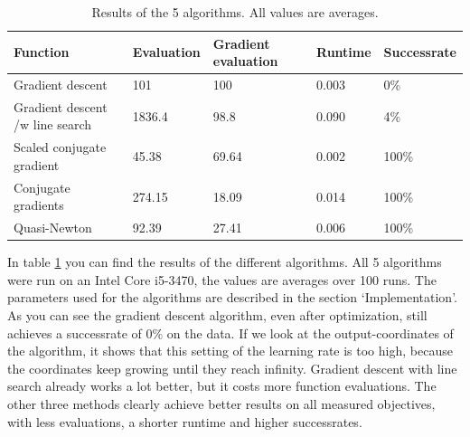 \documentclass{article}
\begin{document}
\begin{table}[H]
	\centering
	\begin{tabular}{| l | l | l | l | l |}
		\hline
		Function                        & Evaluation  & Gradient evaluation & Runtime & Successrate \\ \hline 
		Gradient descent                & 101         & 100  & 0.003          & 0\% \\ \hline
		Gradient descent /w line search & 1836.4      & 98.8   & 0.090          & 4\% \\ \hline
		Scaled conjugate gradient       & 45.38        & 69.64  & 0.002  & 100\% \\ \hline
		Conjugate gradients             & 274.15        & 18.09 & 0.014        & 100\% \\ \hline
		Quasi-Newton                    & 92.39        & 27.41 & 0.006  & 100\% \\ \hline
	\end{tabular}
	\caption{Results of the 5 algorithms. All values are averages.}
	\label{tab:results}
\end{table}

In table \ref{tab:results} you can find the results of the different algorithms. All 5 algorithms were run on an Intel Core i5-3470, the values are averages over 100 runs. The parameters used for the algorithms are described in the section `Implementation'. As you can see the gradient descent algorithm, even after optimization, still achieves a successrate of 0\% on the data. If we look at the output-coordinates of the algorithm, it shows that this setting of the learning rate is too high, because the coordinates keep growing until they reach infinity. Gradient descent with line search already works a lot better, but it costs more function evaluations. The other three methods clearly achieve better results on all measured objectives, with less evaluations, a shorter runtime and higher successrates.
\end{document}
